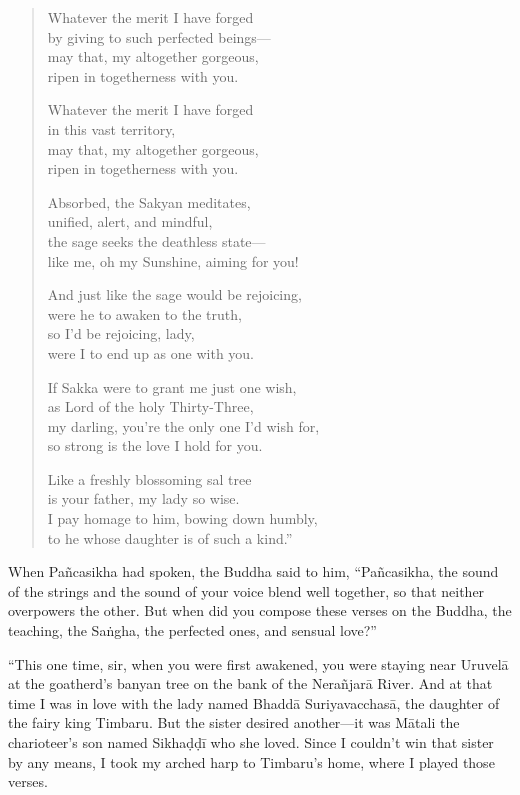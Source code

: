 \documentclass[12pt,openany]{book}%
\begin{document}
\begin{verse}
Whatever the merit I have forged \\
by giving to such perfected beings—\\
may that, my altogether gorgeous, \\
ripen in togetherness with you. 

Whatever the merit I have forged \\
in this vast territory, \\
may that, my altogether gorgeous, \\
ripen in togetherness with you. 

Absorbed, the Sakyan meditates, \\
unified, alert, and mindful, \\
the sage seeks the deathless state—\\
like me, oh my Sunshine, aiming for you! 

And just like the sage would be rejoicing, \\
were he to awaken to the truth, \\
so I’d be rejoicing, lady, \\
were I to end up as one with you. 

If Sakka were to grant me just one wish, \\
as Lord of the holy Thirty-Three, \\
my darling, you’re the only one I’d wish for, \\
so strong is the love I hold for you. 

Like a freshly blossoming sal tree \\
is your father, my lady so wise. \\
I pay homage to him, bowing down humbly, \\
to he whose daughter is of such a kind.” 

%
\end{verse}

When \textsanskrit{Pañcasikha} had spoken, the Buddha said to him, “\textsanskrit{Pañcasikha}, the sound of the strings and the sound of your voice blend well together, so that neither overpowers the other. But when did you compose these verses on the Buddha, the teaching, the \textsanskrit{Saṅgha}, the perfected ones, and sensual love?” 

“This one time, sir, when you were first awakened, you were staying near \textsanskrit{Uruvelā} at the goatherd’s banyan tree on the bank of the \textsanskrit{Nerañjarā} River. And at that time I was in love with the lady named \textsanskrit{Bhaddā} \textsanskrit{Suriyavacchasā}, the daughter of the fairy king Timbaru. But the sister desired another—it was \textsanskrit{Mātali} the charioteer’s son named \textsanskrit{Sikhaḍḍī} who she loved. Since I couldn’t win that sister by any means, I took my arched harp to Timbaru’s home, where I played those verses. 
\end{document}
